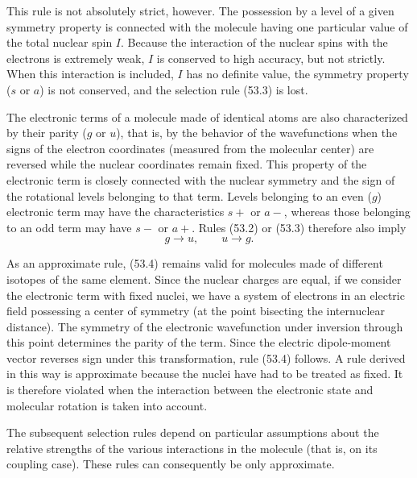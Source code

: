 This rule is not absolutely strict, however. The possession by a level of a given symmetry property is connected with the molecule having one particular value of the total nuclear spin $I$. Because the interaction of the nuclear spins with the electrons is extremely weak, $I$ is conserved to high accuracy, but not strictly. When this interaction is included, $I$ has no definite value, the symmetry property ($s$ or $a$) is not conserved, and the selection rule (53.3) is lost.

The electronic terms of a molecule made of identical atoms are also characterized by their parity ($g$ or $u$), that is, by the behavior of the wavefunctions when the signs of the electron coordinates (measured from the molecular center) are reversed while the nuclear coordinates remain fixed. This property of the electronic term is closely connected with the nuclear symmetry and the sign of the rotational levels belonging to that term. Levels belonging to an even ($g$) electronic term may have the characteristics $s+$ or $a-$, whereas those belonging to an odd term may have $s-$ or $a+$. Rules (53.2) or (53.3) therefore also imply
\begin{equation}
g\to u,\qquad u\to g.
\tag{53.4}
\end{equation}

As an approximate rule, (53.4) remains valid for molecules made of different isotopes of the same element. Since the nuclear charges are equal, if we consider the electronic term with fixed nuclei, we have a system of electrons in an electric field possessing a center of symmetry (at the point bisecting the internuclear distance). The symmetry of the electronic wavefunction under inversion through this point determines the parity of the term. Since the electric dipole-moment vector reverses sign under this transformation, rule (53.4) follows. A rule derived in this way is approximate because the nuclei have had to be treated as fixed. It is therefore violated when the interaction between the electronic state and molecular rotation is taken into account.

The subsequent selection rules depend on particular assumptions about the relative strengths of the various interactions in the molecule (that is, on its coupling case). These rules can consequently be only approximate.

